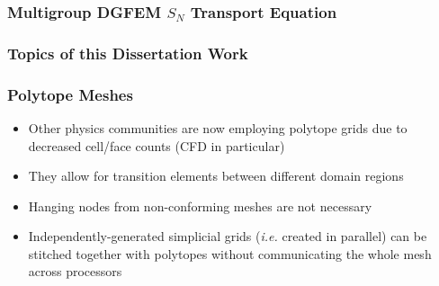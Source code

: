 \documentclass[compress,10pt]{beamer}
\begin{document}
\begin{frame}[t]\frametitle{Multigroup DGFEM $S_N$ Transport Equation}

\end{frame}
\begin{frame}[t]\frametitle{Topics of this Dissertation Work}

\end{frame}
\begin{frame}[t]\frametitle{Polytope Meshes}
         \begin{block}{}{\footnotesize
			\begin{itemize}
				\item <1-> Other physics communities are now employing polytope grids due to decreased cell/face counts (CFD in particular)
				\item <2-> They allow for transition elements between different domain regions
				\item <3-> Hanging nodes from non-conforming meshes are not necessary
				\item <4-> Independently-generated simplicial grids ({\em i.e.} created in parallel) can be stitched together with polytopes without communicating the whole mesh across processors
			\end{itemize}}
         \end{block}
\centering
{}
\end{frame}
\end{document}
